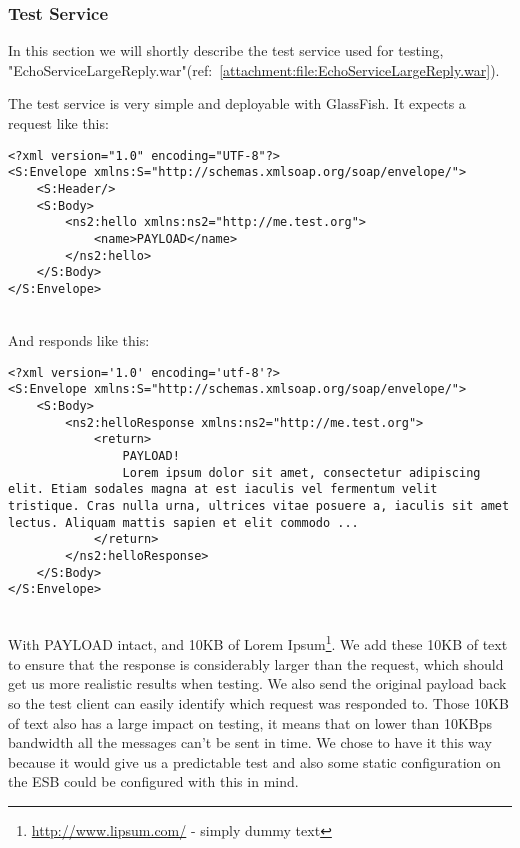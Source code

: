 \subsubsection{Test Service}\label{Testing:About:Service}
    In this section we will shortly describe the test service used for testing, "EchoServiceLargeReply.war"(ref:~\ref{attachment:file:EchoServiceLargeReply.war}).

    The test service is very simple and deployable with GlassFish. It expects a request like this:
    \lstset{language=XML, style=eclipse}
    \begin{lstlisting}
<?xml version="1.0" encoding="UTF-8"?>
<S:Envelope xmlns:S="http://schemas.xmlsoap.org/soap/envelope/">
    <S:Header/>
    <S:Body>
        <ns2:hello xmlns:ns2="http://me.test.org">
            <name>PAYLOAD</name>
        </ns2:hello>
    </S:Body>
</S:Envelope>
    \end{lstlisting}
    \\
    And responds like this:
    \begin{lstlisting}
<?xml version='1.0' encoding='utf-8'?>
<S:Envelope xmlns:S="http://schemas.xmlsoap.org/soap/envelope/">
    <S:Body>
        <ns2:helloResponse xmlns:ns2="http://me.test.org">
            <return>
                PAYLOAD!
                Lorem ipsum dolor sit amet, consectetur adipiscing elit. Etiam sodales magna at est iaculis vel fermentum velit tristique. Cras nulla urna, ultrices vitae posuere a, iaculis sit amet lectus. Aliquam mattis sapien et elit commodo ...
            </return>
        </ns2:helloResponse>
    </S:Body>
</S:Envelope>
    \end{lstlisting}
    \\
    With PAYLOAD intact, and 10KB of Lorem Ipsum\footnote{\url{http://www.lipsum.com/} - simply dummy text}. We add these 10KB of text to ensure that the response is considerably larger than the request, which should get us more realistic results when testing. We also send the original payload back so the test client can easily identify which request was responded to. Those 10KB of text also has a large impact on testing, it means that on lower than 10KBps bandwidth all the messages can't be sent in time. We chose to have it this way because it would give us a predictable test and also some static configuration on the ESB could be configured with this in mind.

